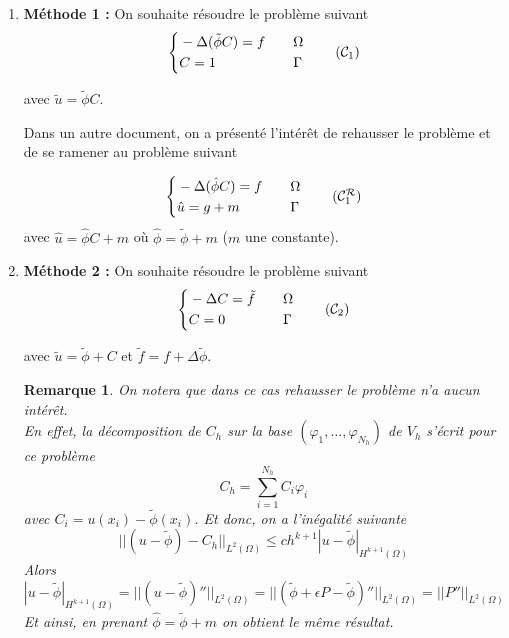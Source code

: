 \documentclass[french]{article}
\newtheorem*{Rem}{Remarque}
\begin{document}
	\begin{enumerate}[label=\textbullet]
		\item \textbf{Méthode 1 : }
		On souhaite résoudre le problème suivant
		\begin{equation}
			\label{pbc1}
			\left\{\begin{aligned}
				&-\Delta (\tilde{\phi}C)=f \quad &&\Omega \\
				&C=1 \quad &&\Gamma
			\end{aligned}\right. \tag{$\mathcal{C}_1$}
		\end{equation}
		
		avec $\tilde{u}=\tilde{\phi}C$.
		
		Dans un autre document, on a présenté l'intérêt de rehausser le problème et de se ramener au problème suivant
		
		\begin{equation}
			\left\{\begin{aligned}
				&-\Delta (\hat{\phi}C)=f \quad &&\Omega \\
				&\hat{u}=g+m \quad &&\Gamma
			\end{aligned}\right. \label{pbc1r} \tag{$\mathcal{C}_1^\mathcal{R}$}
		\end{equation}
		avec $\hat{u}=\hat{\phi}C+m$ où $\hat{\phi}=\tilde{\phi}+m$ ($m$ une constante).
		
		
		\item \textbf{Méthode 2 : } On souhaite résoudre le problème suivant
		\begin{equation}
			\label{pbc2}
			\left\{\begin{aligned}
				&-\Delta C=\tilde{f} \quad &&\Omega \\
				&C=0 \quad &&\Gamma
			\end{aligned}\right. \tag{$\mathcal{C}_2$}
		\end{equation}
		
		avec $\tilde{u}=\tilde{\phi}+C$ et $\tilde{f}=f+\Delta\tilde{\phi}$.
		
		\begin{Rem}
			On notera que dans ce cas rehausser le problème n'a aucun intérêt. \\
			En effet, la décomposition de $C_h$ sur la base $(\varphi_1,\dots,\varphi_{N_h})$ de $V_h$ s'écrit pour ce problème			
			$$C_h=\sum_{i=1}^{N_h}C_i\varphi_i$$
			avec $C_i=u(x_i)-\tilde{\phi}(x_i)$.
			Et donc, on a l'inégalité suivante
			$$||(u-\tilde{\phi})-C_h||_{L^2(\Omega)}\le ch^{k+1}|u-\tilde{\phi}|_{H^{k+1}(\Omega)}$$
			Alors
			$$|u-\tilde{\phi}|_{H^{k+1}(\Omega)}=||(u-\tilde{\phi})''||_{L^2(\Omega)}=||(\tilde{\phi}+\epsilon P-\tilde{\phi})''||_{L^2(\Omega)}=||P''||_{L^2(\Omega)}$$
			Et ainsi, en prenant $\hat{\phi}=\tilde{\phi}+m$ on obtient le même résultat.
		\end{Rem}
	\end{enumerate}
\end{document}
